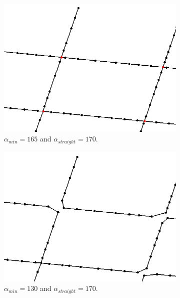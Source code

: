 \documentclass[11pt]{article}
\begin{document}
\begin{figure}[h]
\centering
  \begin{subfigure}{.4\linewidth}
  \centering
  \graphicspath{ {images/}}
  \includegraphics[width=\linewidth]{given167_170}
  \caption{$\alpha_{min}=165$ and $\alpha_{straight}=170$. }
  \label{givena}
  \end{subfigure}
    \begin{subfigure}{0.4\linewidth}
  \centering
  \graphicspath{ {images/}}
  \includegraphics[width=\linewidth]{given90_90}
  \caption{$\alpha_{min}=130$ and $\alpha_{straight}=170$.}
  \label{givenb}
  \end{subfigure}
  \caption{}
  \label{given}
\end{figure}
\end{document}
